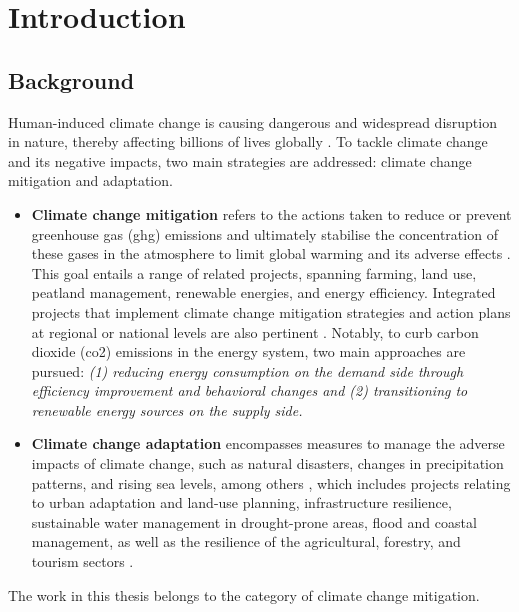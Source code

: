 \chapter{Introduction}


\section{Background}
Human-induced climate change is causing dangerous and widespread disruption in nature, thereby affecting billions of lives globally \cite{ipcc}. 
To tackle climate change and its negative impacts, two main strategies are addressed: climate change mitigation and adaptation.

\begin{itemize}
  \item \textbf{Climate change mitigation} refers to the actions taken to reduce or prevent greenhouse gas (\gls{ghg}) emissions and ultimately stabilise the concentration of these gases in the atmosphere to limit global warming and its adverse effects \cite{handbook}.
  This goal entails a range of related projects, spanning farming, land use, peatland management, renewable energies, and energy efficiency. Integrated projects that implement climate change mitigation strategies and action plans at regional or national levels are also pertinent \cite{ec}.
  Notably, to curb carbon dioxide (\gls{co2}) emissions in the energy system, two main approaches are pursued:
\emph{
  (1) reducing energy consumption on the demand side through efficiency improvement and behavioral changes and
  (2) transitioning to renewable energy sources on the supply side.
}
  \item \textbf{Climate change adaptation} encompasses measures to manage the adverse impacts of climate change, such as natural disasters, changes in precipitation patterns, and rising sea levels, among others \cite{handbook},
  which includes projects relating to urban adaptation and land-use planning, infrastructure resilience, sustainable water management in drought-prone areas, flood and coastal management, as well as the resilience of the agricultural, forestry, and tourism sectors \cite{ec}.  
\end{itemize}

The work in this thesis belongs to the category of climate change mitigation. 


